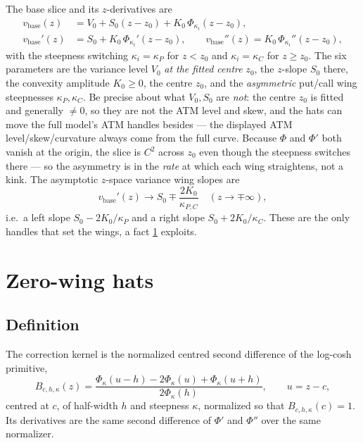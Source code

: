 \documentclass[11pt]{article}
\begin{document}
The base slice and its $z$-derivatives are
\begin{equation}
\begin{aligned}
v_{\text{base}}(z)&=V_0+S_0(z-z_0)+K_0\,\Phi_{\kappa_i}(z-z_0),\\
v_{\text{base}}'(z)&=S_0+K_0\,\Phi_{\kappa_i}'(z-z_0),\qquad
v_{\text{base}}''(z)=K_0\,\Phi_{\kappa_i}''(z-z_0),
\end{aligned}
\label{eq:base}
\end{equation}
with the steepness switching $\kappa_i=\kappa_P$ for $z<z_0$ and
$\kappa_i=\kappa_C$ for $z\ge z_0$. The six parameters are the variance level
$V_0$ \emph{at the fitted centre} $z_0$, the $z$-slope $S_0$ there, the
convexity amplitude $K_0\ge0$, the centre $z_0$, and the \emph{asymmetric}
put/call wing steepnesses $\kappa_P,\kappa_C$. Be precise about what $V_0,S_0$
are \emph{not}: the centre $z_0$ is fitted and generally $\ne0$, so they are
not the ATM level and skew, and the hats can move the full model's ATM handles
besides --- the displayed ATM level/skew/curvature always come from the full
curve. Because $\Phi$ and $\Phi'$ both vanish at the origin, the
slice is $C^2$ across $z_0$ even though the steepness switches there --- so the
asymmetry is in the \emph{rate} at which each wing straightens, not a kink. The
asymptotic $z$-space variance wing slopes are
\begin{equation}
v_{\text{base}}'(z)\to S_0\mp\frac{2K_0}{\kappa_{P,C}}
\quad(z\to\mp\infty),
\label{eq:wing_slopes}
\end{equation}
i.e.\ a left slope $S_0-2K_0/\kappa_P$ and a right slope $S_0+2K_0/\kappa_C$.
These are the only handles that set the wings, a fact \cref{sec:hats} exploits.

\section{Zero-wing hats}
\label{sec:hats}

\subsection{Definition}

The correction kernel is the normalized centred second difference of the
log-cosh primitive,
\begin{equation}
B_{c,h,\kappa}(z)=\frac{\Phi_\kappa(u-h)-2\Phi_\kappa(u)+\Phi_\kappa(u+h)}{2\Phi_\kappa(h)},
\qquad u=z-c,
\label{eq:hat}
\end{equation}
centred at $c$, of half-width $h$ and steepness $\kappa$, normalized so that
$B_{c,h,\kappa}(c)=1$. Its derivatives are the same second difference of $\Phi'$
and $\Phi''$ over the same normalizer.
\end{document}
